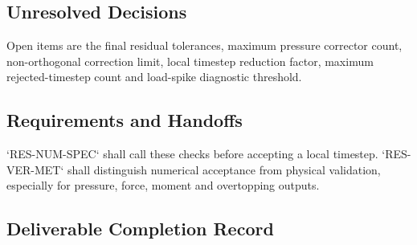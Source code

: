 \subsection{Unresolved Decisions}
\label{sec:res-num-stb-unresolved-decisions}


Open items are the final residual tolerances, maximum pressure
corrector count, non-orthogonal correction limit, local timestep
reduction factor, maximum rejected-timestep count and load-spike
diagnostic threshold.

\subsection{Requirements and Handoffs}
\label{sec:res-num-stb-requirements}


`RES-NUM-SPEC` shall call these checks before accepting a local
timestep. `RES-VER-MET` shall distinguish numerical acceptance from
physical validation, especially for pressure, force, moment and
overtopping outputs.

\subsection{Deliverable Completion Record}
\label{sec:res-num-stb-completion-record}

%
%
%
